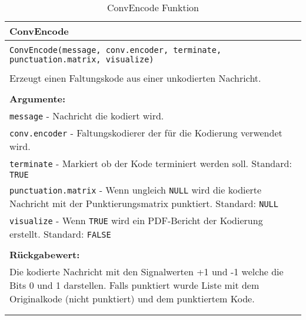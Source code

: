 \begin{longtable}{|p{\textwidth}|}
\hline
\rowcolor{lightblue}
ConvEncode
\\
\hline
\\
\texttt{ConvEncode(message, conv.encoder, terminate, punctuation.matrix, visualize)}\\
\\
Erzeugt einen Faltungskode aus einer unkodierten Nachricht.\\
\\
\textbf{Argumente:}\\
\texttt{message} - Nachricht die kodiert wird.\\
\texttt{conv.encoder} - Faltungskodierer der für die Kodierung verwendet wird.\\
\texttt{terminate} - Markiert ob der Kode terminiert werden soll. Standard: \texttt{TRUE}\\
\texttt{punctuation.matrix} - Wenn ungleich \texttt{NULL} wird die kodierte Nachricht mit der Punktierungsmatrix punktiert. Standard: \texttt{NULL}\\
\texttt{visualize} - Wenn \texttt{TRUE} wird ein PDF-Bericht der Kodierung erstellt. Standard: \texttt{FALSE}\\
\\
\textbf{Rückgabewert:}\\
Die kodierte Nachricht mit den Signalwerten +1 und -1 welche die Bits 0 und 1 darstellen. Falls punktiert wurde Liste mit dem Originalkode (nicht punktiert) und dem punktiertem Kode.\\
\\
\hline
\caption{ConvEncode Funktion}
\end{longtable}
